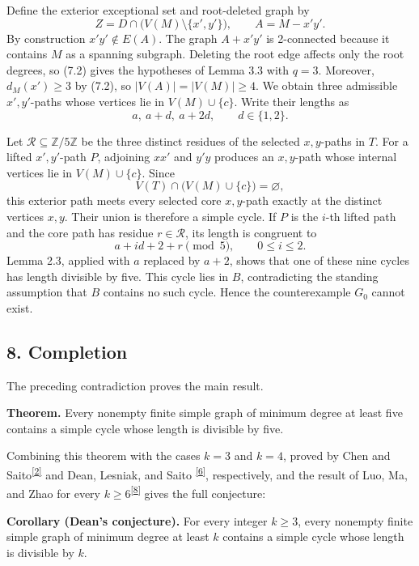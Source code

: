 \documentclass[
  11pt]{article}
\let\papersection\subsection
\renewcommand{\subsection}{\Needspace{10\baselineskip}\papersection}
\begin{document}
Define the exterior exceptional set and root-deleted graph by \[
 Z=D\cap\bigl(V(M)\setminus\{x',y'\}\bigr),
 \qquad
 A=M-x'y'.
\] By construction \(x'y'\notin E(A)\). The graph \(A+x'y'\) is
2-connected because it contains \(M\) as a spanning subgraph. Deleting
the root edge affects only the root degrees, so (7.2) gives the
hypotheses of Lemma 3.3 with \(q=3\). Moreover, \(d_M(x')\ge3\) by
(7.2), so \(|V(A)|=|V(M)|\ge4\). We obtain three admissible
\(x',y'\)-paths whose vertices lie in \(V(M)\cup\{c\}\). Write their
lengths as \[
 a,\ a+d,\ a+2d,
 \qquad d\in\{1,2\}.
\]


Let \(\mathcal R\subseteq\mathbb Z/5\mathbb Z\) be the three distinct
residues of the selected \(x,y\)-paths in \(T\). For a lifted
\(x',y'\)-path \(P\), adjoining \(xx'\) and \(y'y\) produces an
\(x,y\)-path whose internal vertices lie in \(V(M)\cup\{c\}\). Since \[
 V(T)\cap\bigl(V(M)\cup\{c\}\bigr)=\varnothing,
\] this exterior path meets every selected core \(x,y\)-path exactly at
the distinct vertices \(x,y\). Their union is therefore a simple cycle.
If \(P\) is the \(i\)-th lifted path and the core path has residue
\(r\in\mathcal R\), its length is congruent to \[
 a+id+2+r\pmod5,
 \qquad 0\le i\le2.
\] Lemma 2.3, applied with \(a\) replaced by \(a+2\), shows that one of
these nine cycles has length divisible by five. This cycle lies in
\(B\), contradicting the standing assumption that \(B\) contains no such
cycle. Hence the counterexample \(G_0\) cannot exist.

\subsection{8. Completion}\label{completion}

The preceding contradiction proves the main result.

\textbf{Theorem.} Every nonempty finite simple graph of minimum degree
at least five contains a simple cycle whose length is divisible by five.

Combining this theorem with the cases \(k=3\) and \(k=4\), proved by
Chen and Saito\textsuperscript{\hyperref[ref-chen-saito-1994]{{[}2{]}}}
and Dean, Lesniak, and Saito
\textsuperscript{\hyperref[ref-dean-lesniak-saito-1993]{{[}6{]}}},
respectively, and the result of Luo, Ma, and Zhao for every
\(k\ge6\)\textsuperscript{\hyperref[ref-luo-ma-zhao-2026]{{[}8{]}}}
gives the full conjecture:

\textbf{Corollary (Dean's conjecture).} For every integer \(k\ge3\),
every nonempty finite simple graph of minimum degree at least \(k\)
contains a simple cycle whose length is divisible by \(k\).
\end{document}
